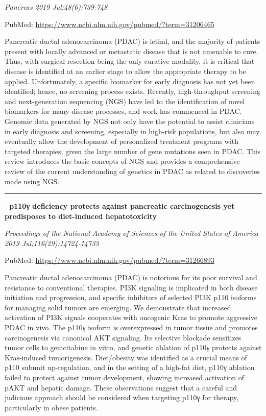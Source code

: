 \documentclass[]{article}
\begin{document}
\emph{Pancreas 2019 Jul;48(6):739-748}

PubMed: \url{https://www.ncbi.nlm.nih.gov/pubmed/?term=31206465}

Pancreatic ductal adenocarcinoma (PDAC) is lethal, and the majority of
patients present with locally advanced or metastatic disease that is not
amenable to cure. Thus, with surgical resection being the only curative
modality, it is critical that disease is identified at an earlier stage
to allow the appropriate therapy to be applied. Unfortunately, a
specific biomarker for early diagnosis has not yet been identified;
hence, no screening process exists. Recently, high-throughput screening
and next-generation sequencing (NGS) have led to the identification of
novel biomarkers for many disease processes, and work has commenced in
PDAC. Genomic data generated by NGS not only have the potential to
assist clinicians in early diagnosis and screening, especially in
high-risk populations, but also may eventually allow the development of
personalized treatment programs with targeted therapies, given the large
number of gene mutations seen in PDAC. This review introduces the basic
concepts of NGS and provides a comprehensive review of the current
understanding of genetics in PDAC as related to discoveries made using
NGS.

{}

{}

\begin{center}\rule{0.5\linewidth}{\linethickness}\end{center}

 - \textbf{p110γ deficiency protects against pancreatic carcinogenesis
yet predisposes to diet-induced hepatotoxicity}

\emph{Proceedings of the National Academy of Sciences of the United
States of America 2019 Jul;116(29):14724-14733}

PubMed: \url{https://www.ncbi.nlm.nih.gov/pubmed/?term=31266893}

Pancreatic ductal adenocarcinoma (PDAC) is notorious for its poor
survival and resistance to conventional therapies. PI3K signaling is
implicated in both disease initiation and progression, and specific
inhibitors of selected PI3K p110 isoforms for managing solid tumors are
emerging. We demonstrate that increased activation of PI3K signals
cooperates with oncogenic Kras to promote aggressive PDAC in vivo. The
p110γ isoform is overexpressed in tumor tissue and promotes
carcinogenesis via canonical AKT signaling. Its selective blockade
sensitizes tumor cells to gemcitabine in vitro, and genetic ablation of
p110γ protects against Kras-induced tumorigenesis. Diet/obesity was
identified as a crucial means of p110 subunit up-regulation, and in the
setting of a high-fat diet, p110γ ablation failed to protect against
tumor development, showing increased activation of pAKT and hepatic
damage. These observations suggest that a careful and judicious approach
should be considered when targeting p110γ for therapy, particularly in
obese patients.
\end{document}
